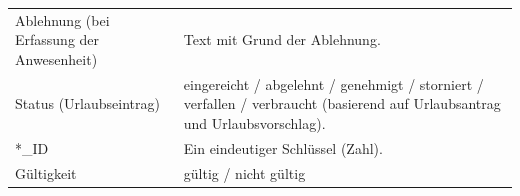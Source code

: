 \begin{tabular}{L{0.3} L{0.7}}
Ablehnung (bei Erfassung der Anwesenheit)					&	Text mit Grund der Ablehnung.				\\
Status (Urlaubseintrag)					&	eingereicht / abgelehnt / genehmigt / storniert / verfallen / verbraucht (basierend auf Urlaubsantrag und Urlaubsvorschlag).				\\
*\_ID					&	Ein eindeutiger Schlüssel (Zahl).				\\
Gültigkeit					&	gültig / nicht gültig				\\
\end{tabular}

 
